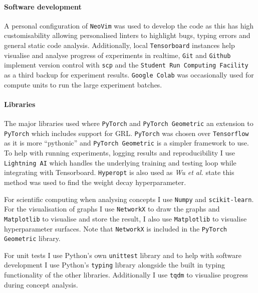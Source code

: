 \paragraph{Software development}

A personal configuration of \texttt{NeoVim} was used to develop the code as this has high customisability allowing personalised linters to highlight bugs, typing errors and general static code analysis.
Additionally, local \texttt{Tensorboard}\cite{tensorflow2015-whitepaper} instances help visualise and analyse progress of experiments in realtime, \texttt{Git} and \texttt{Github} implement version control with \texttt{scp} and the \texttt{Student Run Computing Facility} as a third backup for experiment results.
\texttt{Google Colab} was occasionally used for compute units to run the large experiment batches.

\paragraph{Libraries}
\label{sec:libraries}

The major libraries used where \texttt{PyTorch} \cite{paszke2019pytorch} and \texttt{PyTorch Geometric} \cite{Fey/Lenssen/2019} an extension to \texttt{PyTorch} which includes support for GRL.
\texttt{PyTorch} was chosen over \texttt{Tensorflow}\cite{tensorflow2015-whitepaper} as it is more ``pythonic'' and \texttt{PyTorch Geometric} is a simpler framework to use.
To help with running experiments, logging results and reproducibility I use \texttt{Lightning AI} which handles the underlying training and testing loop while integrating with Tensorboard.
\texttt{Hyperopt}\cite{bergstra2013making} is also used as \textit{Wu et al.}\cite{wu2019simplifying} state this method was used to find the weight decay hyperparameter.

For scientific computing when analysing concepts I use \texttt{Numpy} and \texttt{scikit-learn}\cite{scikit-learn}. For the visualisation of graphs I use \texttt{NetworkX}\cite{SciPyProceedings_11} to draw the graphs and \texttt{Matplotlib}\cite{Hunter:2007} to visualise and store the result, I also use \texttt{Matplotlib} to visualise hyperparameter surfaces. Note that \texttt{NetworkX} is included in the \texttt{PyTorch Geometric} library.

For unit tests I use Python's own \texttt{unittest} library and to help with software development I use Python's \texttt{typing} library alongside the built in typing functionality of the other libraries. Additionally I use \texttt{tqdm}\cite{casper_da_costa_luis_2023_7697295} to visualise progress during concept analysis.

